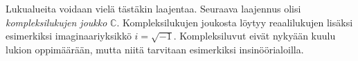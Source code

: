 
Lukualueita voidaan vielä tästäkin laajentaa. Seuraava laajennus olisi \emph{kompleksilukujen joukko} $\mathbb{C}$. Kompleksilukujen joukosta löytyy reaalilukujen lisäksi
esimerkiksi imaginaariyksikkö $i = \sqrt{-1}$.
Kompleksiluvut eivät nykyään kuulu lukion oppimäärään, mutta
niitä tarvitaan esimerkiksi insinöörialoilla.